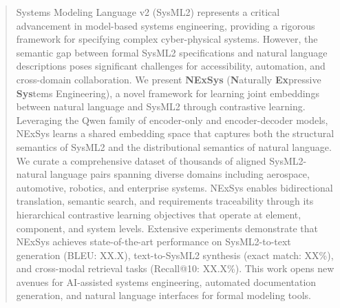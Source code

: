 \documentclass{article}
\begin{document}

\printAffiliationsAndNotice{}

\begin{abstract}
Systems Modeling Language v2 (SysML2) represents a critical advancement in model-based systems engineering, providing a rigorous framework for specifying complex cyber-physical systems. However, the semantic gap between formal SysML2 specifications and natural language descriptions poses significant challenges for accessibility, automation, and cross-domain collaboration. We present \textbf{NExSys} (\textbf{N}aturally \textbf{Ex}pressive \textbf{Sys}tems Engineering), a novel framework for learning joint embeddings between natural language and SysML2 through contrastive learning. Leveraging the Qwen family of encoder-only and encoder-decoder models, NExSys learns a shared embedding space that captures both the structural semantics of SysML2 and the distributional semantics of natural language. We curate a comprehensive dataset of thousands of aligned SysML2-natural language pairs spanning diverse domains including aerospace, automotive, robotics, and enterprise systems. NExSys enables bidirectional translation, semantic search, and requirements traceability through its hierarchical contrastive learning objectives that operate at element, component, and system levels. Extensive experiments demonstrate that NExSys achieves state-of-the-art performance on SysML2-to-text generation (BLEU: XX.X), text-to-SysML2 synthesis (exact match: XX\%), and cross-modal retrieval tasks (Recall@10: XX.X\%). This work opens new avenues for AI-assisted systems engineering, automated documentation generation, and natural language interfaces for formal modeling tools.
\end{abstract}
\end{document}
